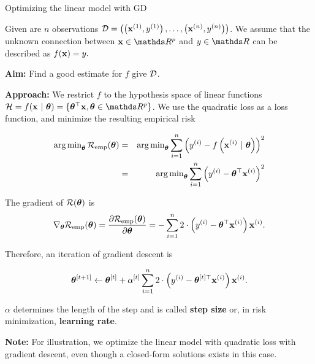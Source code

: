 \documentclass[11pt,compress,t,notes=noshow, xcolor=table]{beamer}
\begin{document}
\begin{vbframe}{Optimizing the linear model with GD}

	Given are $n$ observations $\mathcal{D} = \left( \left(\mathbf{x}^{(1)}, y^{(1)}\right), \ldots, \left(\mathbf{x}^{(n)}, y^{(n)}\right)\right)$. We assume that the unknown connection between $\xv \in \R^p$ and $y\in \R$ can be described as $f(\mathbf{x}) = y.$
	
	\vspace*{0.2cm}

	\textbf{Aim:} Find a good estimate for $f$ give $\mathcal{D}$. 

	\vspace*{0.2cm}

	\textbf{Approach:} We restrict $f$ to the hypothesis space of linear functions $\Hspace = \fxt = \{\thetab^{\top}\xv, \thetab \in \R^p\}$. We use the quadratic loss as a loss function, and minimize the resulting empirical risk
	
	\begin{eqnarray*}
	\operatorname{arg\,min}_{\bm{\theta}}\mathcal{R}_{\text{emp}}(\bm{\theta}) &=& \operatorname{arg\,min}_{\bm{\theta}} \sum_{i=1}^n \left(y^{(i)} - f\left(\mathbf{x}^{(i)} ~|~ \bm{\theta}\right)\right)^2 \\ &=& \operatorname{arg\,min}_{\bm{\theta}} \sum_{i=1}^n \left(y^{(i)} - \bm{\theta}^{\top} \mathbf{x}^{(i)}\right)^2 \\
	\end{eqnarray*}
	

	\framebreak
	
	The gradient of $\mathcal{R}(\bm{\theta})$ is 	
	$$
	\nabla_{\bm{\theta}}\mathcal{R}_{\text{emp}}(\bm{\theta}) =  \frac{\partial \mathcal{R}_{\text{emp}}(\bm{\theta})}{\partial
	\bm{\theta}} = - \sum_{i=1}^n 2 \cdot \left(y^{(i)} - \bm{\theta}^{\top} \mathbf{x}^{(i)}\right) \mathbf{x}^{(i)}.
	$$
	
	Therefore, an iteration of gradient descent is
	
	$$
	\bm{\theta}^{[t +1]} \leftarrow \bm{\theta}^{[t]} + \alpha^{[t]} \sum_{i=1}^n 2 \cdot \left(y^{(i)} - \bm{\theta}^{[t]\top} \mathbf{x}^{(i)}\right) \mathbf{x}^{(i)}.
	$$
	
	$\alpha$ determines the length of the step and is called \textbf{step size} or, in risk minimization, \textbf{learning rate}.

	\lz 

	\begin{footnotesize}
	\textbf{Note: } For illustration, we optimize the linear model with quadratic loss with gradient descent, even though a closed-form solutions exists in this case. 
	\end{footnotesize}


\end{vbframe}
\end{document}
